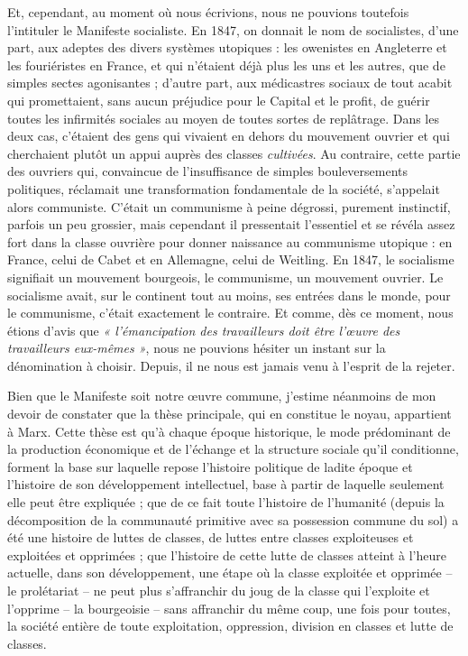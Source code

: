 \documentclass[french,twoside]{book} %
\begin{document}
Et, cependant, au moment où nous écrivions, nous ne pouvions toutefois l’intituler le Manifeste socialiste. En 1847, on donnait le nom de socialistes, d’une part, aux adeptes des divers systèmes utopiques : les owenistes en Angleterre et les fouriéristes en France, et qui n’étaient déjà plus les uns et les autres, que de simples sectes agonisantes ; d’autre part, aux médicastres sociaux de tout acabit qui promettaient, sans aucun préjudice pour le Capital et le profit, de guérir toutes les infirmités sociales au moyen de toutes sortes de replâtrage. Dans les deux cas, c’étaient des gens qui vivaient en dehors du mouvement ouvrier et qui cherchaient plutôt un appui auprès des classes \emph{cultivées}. Au contraire, cette partie des ouvriers qui, convaincue de l’insuffisance de simples bouleversements politiques, réclamait une transformation fondamentale de la société, s’appelait alors communiste. C'était un communisme à peine dégrossi, purement instinctif, parfois un peu grossier, mais cependant il pressentait l’essentiel et se révéla assez fort dans la classe ouvrière pour donner naissance au communisme utopique : en France, celui de Cabet et en Allemagne, celui de Weitling. En 1847, le socialisme signifiait un mouvement bourgeois, le communisme, un mouvement ouvrier. Le socialisme avait, sur le continent tout au moins, ses entrées dans le monde, pour le communisme, c’était exactement le contraire. Et comme, dès ce moment, nous étions d’avis que \emph{« l’émancipation des travailleurs doit être l’œuvre des travailleurs eux-mêmes »}, nous ne pouvions hésiter un instant sur la dénomination à choisir. Depuis, il ne nous est jamais venu à l’esprit de la rejeter.\par
Bien que le Manifeste soit notre œuvre commune, j’estime néanmoins de mon devoir de constater que la thèse principale, qui en constitue le noyau, appartient à Marx. Cette thèse est qu’à chaque époque historique, le mode prédominant de la production économique et de l’échange et la structure sociale qu’il conditionne, forment la base sur laquelle repose l’histoire politique de ladite époque et l’histoire de son développement intellectuel, base à partir de laquelle seulement elle peut être expliquée ; que de ce fait toute l’histoire de l’humanité (depuis la décomposition de la communauté primitive avec sa possession commune du sol) a été une histoire de luttes de classes, de luttes entre classes exploiteuses et exploitées et opprimées ; que l’histoire de cette lutte de classes atteint à l’heure actuelle, dans son développement, une étape où la classe exploitée et opprimée – le prolétariat – ne peut plus s’affranchir du joug de la classe qui l’exploite et l’opprime – la bourgeoisie – sans affranchir du même coup, une fois pour toutes, la société entière de toute exploitation, oppression, division en classes et lutte de classes.\par
\end{document}
